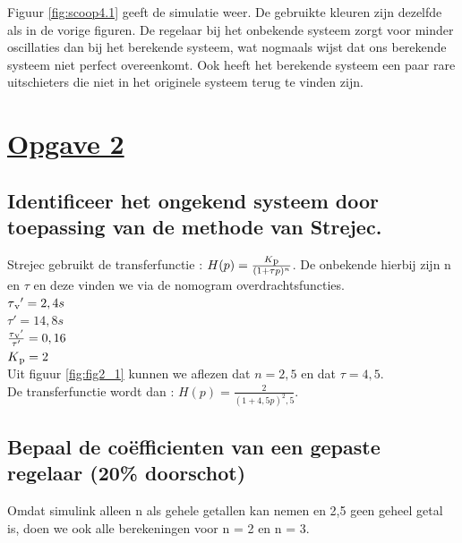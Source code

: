 \documentclass[a4paper, 12pt]{article}
\begin{document}
Figuur \ref{fig:scoop4.1} geeft de simulatie weer. De gebruikte kleuren zijn dezelfde als in de vorige figuren. De regelaar bij het onbekende systeem zorgt voor minder oscillaties dan bij het berekende systeem, wat nogmaals wijst dat ons berekende systeem niet perfect overeenkomt. Ook heeft het berekende systeem een paar rare uitschieters die niet in het originele systeem terug te vinden zijn.

\newpage

\section{\underline{Opgave 2}}

\subsection{Identificeer het ongekend systeem door toepassing van de methode van Strejec.}

Strejec gebruikt de transferfunctie : $H(p) = \frac{K\textsubscript{p}}{(1+\tau p)^n}$. De onbekende hierbij zijn n en $\tau$ en deze vinden we via de nomogram overdrachtsfuncties. \\ [2ex]
$\tau\textsubscript{v}' = 2,4s$ \\
$\tau' = 14,8s$ \\ [2ex]
$\frac{\tau\textsubscript{v}'}{\tau'} = 0,16$ \\
$K\textsubscript{p} = 2$ \\

Uit figuur \ref{fig:fig2_1} kunnen we aflezen dat $n = 2,5$ en dat $\tau = 4,5$. \\
De transferfunctie wordt dan : $H(p) = \frac{2}{(1+4,5p)^2,5}$.

\subsection{Bepaal de coëfficienten van een gepaste regelaar (20\% doorschot)}

Omdat simulink alleen n als gehele getallen kan nemen en 2,5 geen geheel getal is, doen we ook alle berekeningen voor n = 2 en n = 3.

\begin{table}[!h]
\begin{large}
\centering
{}
\end{large}
\end{table}
\end{document}
